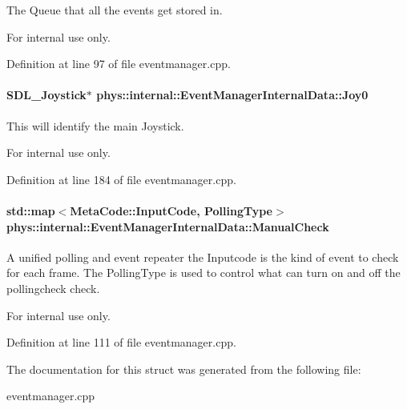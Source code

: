 The Queue that all the events get stored in. 

\begin{DoxyInternal}{For internal use only.}
\end{DoxyInternal}


Definition at line 97 of file eventmanager.cpp.

\hypertarget{structphys_1_1internal_1_1EventManagerInternalData_aafd32b9b23cb2121bd268e3c56a3f46e}{
\paragraph[{Joy0}]{\setlength{\rightskip}{0pt plus 5cm}SDL\_\-Joystick$\ast$ {\bf phys::internal::EventManagerInternalData::Joy0}}\hfill}
\label{d6/d3a/structphys_1_1internal_1_1EventManagerInternalData_aafd32b9b23cb2121bd268e3c56a3f46e}


This will identify the main Joystick. 

\begin{DoxyInternal}{For internal use only.}
\end{DoxyInternal}


Definition at line 184 of file eventmanager.cpp.

\hypertarget{structphys_1_1internal_1_1EventManagerInternalData_a717396b1782d7f491e0f085643507639}{
\paragraph[{ManualCheck}]{\setlength{\rightskip}{0pt plus 5cm}std::map$<${\bf MetaCode::InputCode}, {\bf PollingType}$>$ {\bf phys::internal::EventManagerInternalData::ManualCheck}}\hfill}
\label{d6/d3a/structphys_1_1internal_1_1EventManagerInternalData_a717396b1782d7f491e0f085643507639}


A unified polling and event repeater the Inputcode is the kind of event to check for each frame. The PollingType is used to control what can turn on and off the pollingcheck check. 

\begin{DoxyInternal}{For internal use only.}
\end{DoxyInternal}


Definition at line 111 of file eventmanager.cpp.



The documentation for this struct was generated from the following file:\begin{DoxyCompactItemize}
\item 
eventmanager.cpp\end{DoxyCompactItemize}
